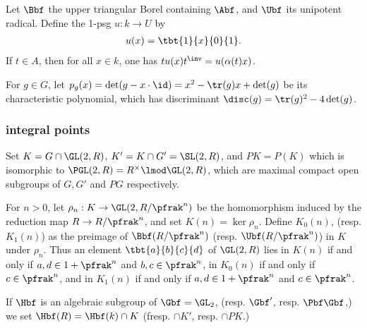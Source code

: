 \documentclass{book}
\begin{document}
Let $\Bbf$ the upper triangular Borel containing $\Abf$, and $\Ubf$ its unipotent radical. Define the 1-psg $u:k \to U$ by
\begin{align*}
    u(x) = \tbt{1}{x}{0}{1}.
\end{align*}
If $t \in A$, then for all $x \in k$, one has $t u(x) t^\inv = u(\alpha(t) x)$.


For $g\in G$, let $p_g(x) = \det(g - x \cdot \id ) = x^2 - \tr(g) x + \det(g)$ be its characteristic polynomial, which has discriminant $\disc(g)= \tr(g)^2 - 4 \det(g)$.


\subsubsection*{integral points}
Set $K= G \cap \GL(2,R)$, $K' = K \cap G' = \SL(2,R)$, and $PK=P(K)$ which is isomorphic to $\PGL(2,R)= R^\times \lmod \GL(2,R)$, which are maximal compact open subgroups of $G,G'$ and $PG$ respectively.

For $n>0$, let $\rho_n :  K \to \GL(2,R/\pfrak^n)$ be the homomorphism induced by the reduction map $R \to R /\pfrak^n$, and set $K(n)= \ker \rho_n$. Define $K_0(n)$, (resp. $K_1(n)$) as the preimage of $\Bbf(R/\pfrak^n)$ (resp. $\Ubf(R/\pfrak^n)$) in $K$ under $\rho_n$.  Thus an element $\tbt{a}{b}{c}{d}$ of $\GL(2,R)$ lies in $K(n)$ if and only if $a,d \in 1 + \pfrak^n$ and $b,c \in  \pfrak^n$, in $K_0(n)$ if and only if $c \in \pfrak ^n$, and in $K_1(n)$ if and only if $a,d \in 1+ \pfrak^n$ and $c \in \pfrak^n$.


If $\Hbf$ is an algebraic subgroup of $\Gbf=\GL_2$, (resp. $\Gbf'$, resp. $\Pbf \Gbf$,) we set $\Hbf(R) = \Hbf(k) \cap K$ (fresp. $\cap K'$, resp. $\cap PK$.)
\end{document}
